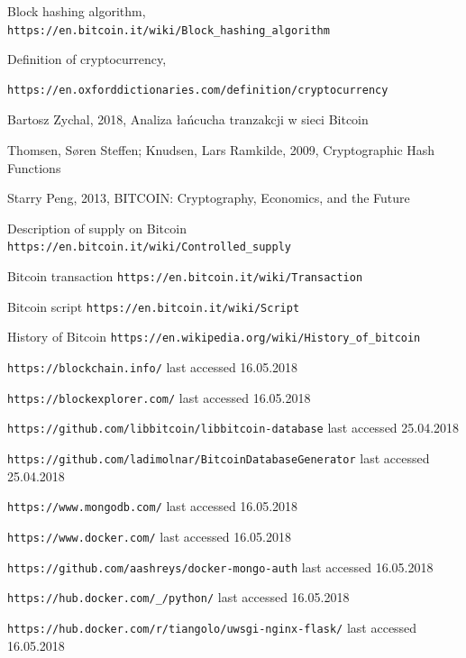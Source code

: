 \documentclass[12pt, en, eng, oneside, final]{mgr}
\begin{document}
\begin{thebibliography}{9}
 
Block hashing algorithm,
\texttt{https://en.bitcoin.it/wiki/Block\_hashing\_algorithm}

Definition of cryptocurrency,
\begin{verbatim}
https://en.oxforddictionaries.com/definition/cryptocurrency
\end{verbatim}

Bartosz Zychal, 2018, Analiza \l{}a\'ncucha tranzakcji w sieci Bitcoin

Thomsen, Søren Steffen; Knudsen, Lars Ramkilde, 2009, Cryptographic Hash Functions

Starry Peng, 2013, BITCOIN: Cryptography, Economics, and the Future

Description of supply on Bitcoin
\texttt{https://en.bitcoin.it/wiki/Controlled\_supply}

Bitcoin transaction
\texttt{https://en.bitcoin.it/wiki/Transaction}

Bitcoin script
\texttt{https://en.bitcoin.it/wiki/Script}

History of Bitcoin
\texttt{https://en.wikipedia.org/wiki/History\_of\_bitcoin}

\texttt{https://blockchain.info/} last accessed 16.05.2018

\texttt{https://blockexplorer.com/} last accessed 16.05.2018

\texttt{https://github.com/libbitcoin/libbitcoin-database} last accessed 25.04.2018

\texttt{https://github.com/ladimolnar/BitcoinDatabaseGenerator} last accessed 25.04.2018

\texttt{https://www.mongodb.com/} last accessed 16.05.2018

\texttt{https://www.docker.com/} last accessed 16.05.2018

\texttt{https://github.com/aashreys/docker-mongo-auth} last accessed 16.05.2018

\texttt{https://hub.docker.com/\_/python/} last accessed 16.05.2018

\texttt{https://hub.docker.com/r/tiangolo/uwsgi-nginx-flask/} last accessed 16.05.2018


\end{thebibliography}
\end{document}
